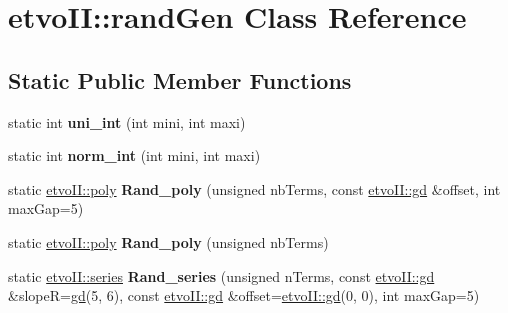 \hypertarget{classetvo_i_i_1_1rand_gen}{}\section{etvo\+II\+:\+:rand\+Gen Class Reference}
\label{classetvo_i_i_1_1rand_gen}
\subsection*{Static Public Member Functions}
\begin{DoxyCompactItemize}
\item 
\mbox{\label{classetvo_i_i_1_1rand_gen_a4363a2d9a3bb53dff78264ad3e0123dc}} 
static int {\bfseries uni\+\_\+int} (int mini, int maxi)
\item 
\mbox{\label{classetvo_i_i_1_1rand_gen_a4337921dc310b89c2473d3e2a0d7fd65}} 
static int {\bfseries norm\+\_\+int} (int mini, int maxi)
\item 
\mbox{\label{classetvo_i_i_1_1rand_gen_abe5be8388f069c984ea0a416dd2f6874}} 
static \mbox{\hyperlink{classetvo_i_i_1_1poly}{etvo\+I\+I\+::poly}} {\bfseries Rand\+\_\+poly} (unsigned nb\+Terms, const \mbox{\hyperlink{classetvo_i_i_1_1gd}{etvo\+I\+I\+::gd}} \&offset, int max\+Gap=5)
\item 
\mbox{\label{classetvo_i_i_1_1rand_gen_a4eaa8f9c89f80bc0b1706733657af7eb}} 
static \mbox{\hyperlink{classetvo_i_i_1_1poly}{etvo\+I\+I\+::poly}} {\bfseries Rand\+\_\+poly} (unsigned nb\+Terms)
\item 
\mbox{\label{classetvo_i_i_1_1rand_gen_aa70969b36e5cc6600959bcf10fae5de9}} 
static \mbox{\hyperlink{classetvo_i_i_1_1series}{etvo\+I\+I\+::series}} {\bfseries Rand\+\_\+series} (unsigned n\+Terms, const \mbox{\hyperlink{classetvo_i_i_1_1gd}{etvo\+I\+I\+::gd}} \&slopeR=\mbox{\hyperlink{classetvo_i_i_1_1gd}{gd}}(5, 6), const \mbox{\hyperlink{classetvo_i_i_1_1gd}{etvo\+I\+I\+::gd}} \&offset=\mbox{\hyperlink{classetvo_i_i_1_1gd}{etvo\+I\+I\+::gd}}(0, 0), int max\+Gap=5)
\item 
\mbox{\label{classetvo_i_i_1_1rand_gen_a15d6c9cab96f643813f37fa71b413ace}} 

\end{DoxyCompactItemize}
